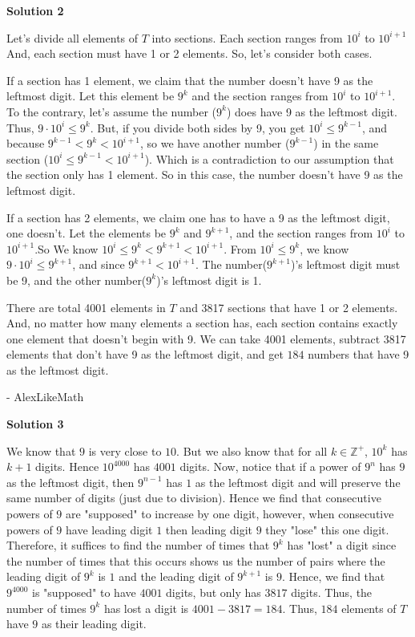 \begin{enumerate}
 



\textbf{Solution 2}

Let's divide all elements of $T$ into sections. Each section ranges from $10^{i}$ to $10^{i+1}$ And, each section must have 1 or 2 elements. So, let's consider both cases. 

 If a section has 1 element, we claim that the number doesn't have 9 as the leftmost digit. Let this element be $9^{k}$ and the section ranges from $10^{i}$ to $10^{i+1}$. To the contrary, let's assume the number ($9^{k}$) does have 9 as the leftmost digit. Thus, $9 \cdot 10^i \leq 9^k$. But, if you divide both sides by 9, you get $10^i \leq 9^{k-1}$, and because $9^{k-1} < 9^{k} < 10^{i+1}$, so we have another number ($9^{k-1}$) in the same section ($10^i \leq 9^{k-1} < 10^{i+1}$). Which is a contradiction to our assumption that the section only has 1 element. So in this case, the number doesn't have 9 as the leftmost digit.

 If a section has 2 elements, we claim one has to have a 9 as the leftmost digit, one doesn't. Let the elements be $9^{k}$ and $9^{k+1}$, and the section ranges from $10^{i}$ to $10^{i+1}$.So We know $10^{i} \leq 9^{k} < 9^{k+1} < 10^{i+1}$. From $10^{i} \leq 9^{k}$, we know $9 \cdot 10^{i} \leq 9^{k+1}$, and since $9^{k+1} < 10^{i+1}$. The number($9^{k+1}$)'s leftmost digit must be 9, and the other number($9^{k}$)'s leftmost digit is 1.

 There are total 4001 elements in $T$ and 3817 sections that have 1 or 2 elements. And, no matter how many elements a section has, each section contains exactly one element that doesn't begin with 9. We can take 4001 elements, subtract 3817 elements that don't have 9 as the leftmost digit, and get $\boxed{184}$ numbers that have 9 as the leftmost digit.

 - AlexLikeMath

 



\textbf{Solution 3}

We know that $9$ is very close to $10$. But we also know that for all $k \in \mathbb{Z}^+$, $10^k$ has $k+1$ digits. Hence $10^{4000}$ has $4001$ digits. Now, notice that if a power of $9^n$ has $9$ as the leftmost digit, then $9^{n-1}$ has $1$ as the leftmost digit and will preserve the same number of digits (just due to division). Hence we find that consecutive powers of $9$ are "supposed" to increase by one digit, however, when consecutive powers of $9$ have leading digit $1$ then leading digit $9$ they "lose" this one digit. Therefore, it suffices to find the number of times that $9^k$ has "lost" a digit since the number of times that this occurs shows us the number of pairs where the leading digit of $9^k$ is $1$ and the leading digit of $9^{k+1}$ is $9$. Hence, we find that $9^{4000}$ is "supposed" to have $4001$ digits, but only has $3817$ digits. Thus, the number of times $9^k$ has lost a digit is $4001-3817 = 184$. Thus, $\boxed{184}$ elements of $T$ have $9$ as their leading digit.


\end{enumerate}
